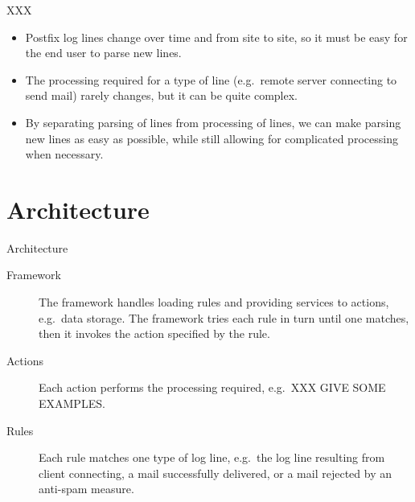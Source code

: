 \documentclass{beamer}
\begin{document}
\begin{frame}{XXX}

    \begin{itemize}

        \item Postfix log lines change over time and from site to site, so
            it must be easy for the end user to parse new lines.

        \item The processing required for a type of line (e.g.\ remote
            server connecting to send mail) rarely changes, but it can be
            quite complex.

        \item By separating parsing of lines from processing of lines, we
            can make parsing new lines as easy as possible, while still
            allowing for complicated processing when necessary.

    \end{itemize}

\end{frame}


\section{Architecture}

\begin{frame}{Architecture}

    \begin{description}

        \item [Framework] The framework handles loading rules and providing
            services to actions, e.g.\ data storage.  The framework tries
            each rule in turn until one matches, then it invokes the action
            specified by the rule.

        \item [Actions] Each action performs the processing required, e.g.\
            XXX GIVE SOME EXAMPLES\@.

        \item [Rules] Each rule matches one type of log line, e.g.\ the log
            line resulting from client connecting, a mail successfully
            delivered, or a mail rejected by an anti-spam measure.

    \end{description}

\end{frame}
\end{document}
